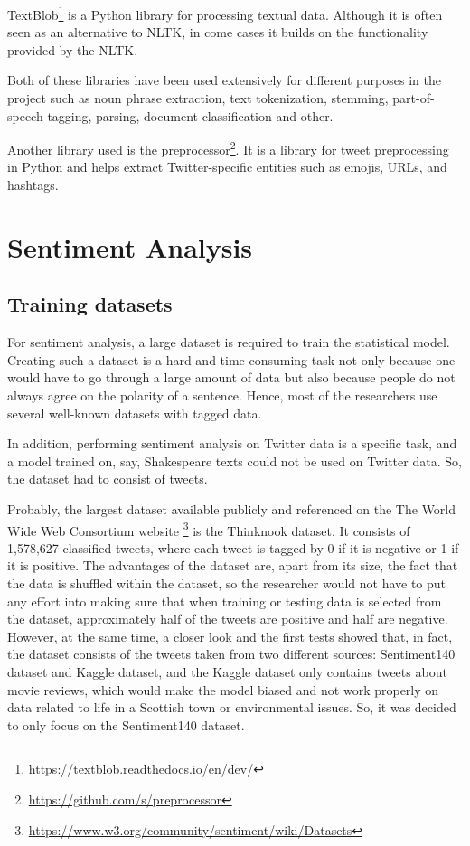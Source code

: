 TextBlob\footnote{\url{https://textblob.readthedocs.io/en/dev/}} is a Python library for processing textual data. Although it is often seen as an alternative to NLTK, in come cases it builds on the functionality provided by the NLTK. 

Both of these libraries have been used extensively for different purposes in the project such as noun phrase extraction, text tokenization, stemming, part-of-speech tagging, parsing, document classification and other. 

Another library used is the preprocessor\footnote{\url{https://github.com/s/preprocessor}}. It is a library for tweet preprocessing in Python and helps extract Twitter-specific entities such as emojis, URLs, and hashtags.

\section{Sentiment Analysis}
\label{sec:sa}

\subsection{Training datasets}

For sentiment analysis, a large dataset is required to train the statistical model. Creating such a dataset is a hard and time-consuming task not only because one would have to go through a large amount of data but also because people do not always agree on the polarity of a sentence. Hence, most of the researchers use several well-known datasets with tagged data. 

In addition, performing sentiment analysis on Twitter data is a specific task, and a model trained on, say, Shakespeare texts could not be used on Twitter data. So, the dataset had to consist of tweets.

Probably, the largest dataset available publicly and referenced on the The World Wide Web Consortium website \footnote{\url{https://www.w3.org/community/sentiment/wiki/Datasets}} is the Thinknook dataset. It consists of 1,578,627 classified tweets, where each tweet is tagged by 0 if it is negative or 1 if it is positive. The advantages of the dataset are, apart from its size, the fact that the data is shuffled within the dataset, so the researcher would not have to put any effort into making sure that when training or testing data is selected from the dataset, approximately half of the tweets are positive and half are negative. However, at the same time, a closer look and the first tests showed that, in fact, the dataset consists of the tweets taken from two different sources: Sentiment140 dataset and Kaggle dataset, and the Kaggle dataset only contains tweets about movie reviews, which would make the model biased and not work properly on data related to life in a Scottish town or environmental issues. So, it was decided to only focus on the Sentiment140 dataset.

